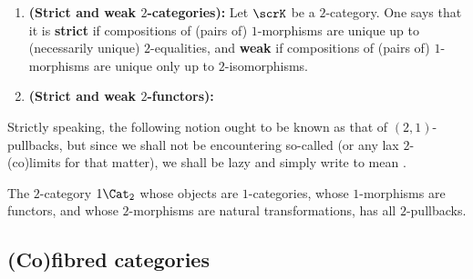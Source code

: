             \begin{definition} \label{def: strict_and_weak_2_categoriesand_2_functors}
                \noindent
                \begin{enumerate}
                    \item \textbf{(Strict and weak $2$-categories):} Let $\scrK$ be a $2$-category. One says that it is \textbf{strict} if compositions of (pairs of) $1$-morphisms are unique up to (necessarily unique) $2$-equalities, and \textbf{weak} if compositions of (pairs of) $1$-morphisms are unique only up to $2$-isomorphisms.
                    \item \textbf{(Strict and weak $2$-functors):}
                \end{enumerate}
            \end{definition}
            \begin{example}
                
            \end{example}
            
            Strictly speaking, the following notion ought to be known as that of $(2, 1)$-pullbacks, but since we shall not be encountering so-called  (or any lax $2$-(co)limits for that matter), we shall be lazy and simply write  to mean .
            \begin{definition}[$2$-pullbacks] \label{def: 2_pullbacks}
                
            \end{definition}
            \begin{example} \label{example: 2_pullbacks_in_the_2_category_of_categories}
                The $2$-category $1\-\Cat_2$ whose objects are $1$-categories, whose $1$-morphisms are functors, and whose $2$-morphisms are natural transformations, has all $2$-pullbacks.
            \end{example}
    
    \subsection{(Co)fibred categories}
